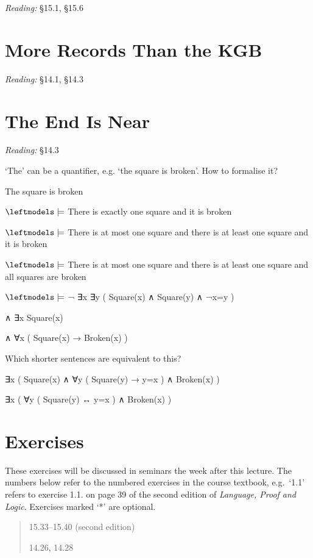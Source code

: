 \documentclass[12pt]{extarticle}
\begin{document}
\begin{multicols*}{3}
\emph{Reading:} §15.1, §15.6
 
 
 
\section{More Records Than the KGB}
 
\emph{Reading:} §14.1, §14.3
 
 
 
\section{The End Is Near}
 
\emph{Reading:} §14.3
 
‘The’ can be a quantifier, e.g. ‘the square is broken’. How to formalise it?
 
The square is broken
 
$\leftmodels\models$ There is exactly one square and it is broken
 
$\leftmodels\models$ There is at most one square and there is at least one square and it is broken
 
$\leftmodels\models$ There is at most one square and there is at least one square and all squares are broken
 
$\leftmodels\models$ ¬ ∃x ∃y ( Square(x) ∧ Square(y) ∧ ¬x=y )
 
\hspace{5mm} ∧ ∃x Square(x)
 
\hspace{5mm} ∧ ∀x ( Square(x) → Broken(x) )
 
Which shorter sentences are equivalent to this?
 
∃x ( Square(x) ∧ ∀y ( Square(y) → y=x ) ∧ Broken(x) )
 
∃x ( ∀y ( Square(y) ↔ y=x ) ∧ Broken(x) )
 
\vfill
\begin{minipage}{\columnwidth}
\section{Exercises}
These exercises will be discussed in seminars the week after this lecture.
The numbers below refer to the numbered exercises in the course textbook, e.g.\ `1.1' refers to exercise 1.1. on page 39 of the second edition of \emph{Language, Proof and Logic}. Exercises marked `*' are optional.
 
\begin{quote}
15.33--15.40 (second edition)
 
14.26, 14.28
 
\end{quote}
\end{minipage}
 


\end{multicols*}
\end{document}
